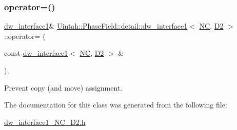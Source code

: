 \subsubsection{\texorpdfstring{operator=()}{operator=()}}
{\footnotesize\ttfamily \hyperlink{classUintah_1_1PhaseField_1_1detail_1_1dw__interface1}{dw\+\_\+interface1}\& \hyperlink{classUintah_1_1PhaseField_1_1detail_1_1dw__interface1}{Uintah\+::\+Phase\+Field\+::detail\+::dw\+\_\+interface1}$<$ \hyperlink{namespaceUintah_1_1PhaseField_a33d355affda78a83f45755ba8388cedda77924170fe82bfd58b74ca3e44139718}{NC}, \hyperlink{namespaceUintah_1_1PhaseField_a12bfc68444894dffdf0cb8d9cf0cc76aa1a451dae278b0103a94105c8776e9a67}{D2} $>$\+::operator= (\begin{DoxyParamCaption}\item[{const \hyperlink{classUintah_1_1PhaseField_1_1detail_1_1dw__interface1}{dw\+\_\+interface1}$<$ \hyperlink{namespaceUintah_1_1PhaseField_a33d355affda78a83f45755ba8388cedda77924170fe82bfd58b74ca3e44139718}{NC}, \hyperlink{namespaceUintah_1_1PhaseField_a12bfc68444894dffdf0cb8d9cf0cc76aa1a451dae278b0103a94105c8776e9a67}{D2} $>$ \&}]{ }\end{DoxyParamCaption})\hspace{0.3cm}{\ttfamily [protected]}, {\ttfamily [delete]}}



Prevent copy (and move) assignment. 



The documentation for this class was generated from the following file\+:\begin{DoxyCompactItemize}
\item 
\hyperlink{dw__interface1__NC__D2_8h}{dw\+\_\+interface1\+\_\+\+N\+C\+\_\+\+D2.\+h}\end{DoxyCompactItemize}
